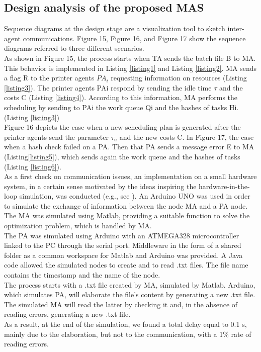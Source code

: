 \subsection{Design analysis of the proposed MAS}
Sequence diagrams at the design stage are a visualization tool to sketch inter-agent communications. Figure 15, Figure 16, and Figure 17 show the sequence diagrams referred to three different scenarios.\\
As shown in Figure 15, the process starts when TA sends the batch file B to MA. This behavior is implemented in Listing \ref{listing1} and Listing \ref{listing2}. MA sends a flag R to the printer agents $PA_i$ requesting information on resources (Listing \ref{listing3}). The printer agents PAi respond by sending the idle time $\tau$ and the costs C (Listing \ref{listing4}). According to this information, MA performs the scheduling by sending to PAi the work queue Qi and the hashes of tasks Hi. (Listing \ref{listing3})\\
Figure 16 depicts the case when a new scheduling plan is generated after the printer agents send the parameter $\tau_u$ and the new costs C. In Figure 17, the case when a hash check failed on a PA. Then that PA sends a message error E to MA (Listing\ref{listing5}), which sends again the work queue and the hashes of tasks (Listing \ref{listing6}).\\
As a first check on communication issues, an implementation on a small hardware system, in a certain sense motivated by the ideas inspiring the hardware-in-the-loop simulation, was conducted (e.g., see \textcite{cha_multi-agent_2015}). An Arduino UNO was used in order to simulate the exchange of information between the node MA and a PA node. The MA was simulated using Matlab, providing a suitable function to solve the optimization problem, which is handled by MA.\\
The PA was simulated using Arduino with an ATMEGA328 microcontroller linked to the PC through the serial port. Middleware in the form of a shared folder as a common workspace for Matlab and Arduino was provided. A Java code allowed the simulated nodes to create and to read .txt files. The file name contains the timestamp and the name of the node.\\
The process starts with a .txt file created by MA, simulated by Matlab. Arduino, which simulates PA, will elaborate the file's content by generating a new .txt file. The simulated MA will read the latter by checking it and, in the absence of reading errors, generating a new .txt file.\\
As a result, at the end of the simulation, we found a total delay equal to 0.1 s, mainly due to the elaboration, but not to the communication, with a 1\% rate of reading errors.

